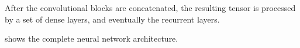 
After the convolutional blocks are concatenated, the
resulting tensor is processed by a set of dense layers, and
eventually the recurrent layers.

 shows the complete neural network
architecture.

